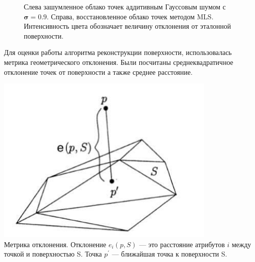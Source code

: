 \begin{figure}
  \centering
  \caption{Слева зашумленное облако точек аддитивным Гауссовым шумом с $\boldsymbol{\sigma = 0.9}$. Справа, восстановленное облако точек методом MLS. Интенсивность цвета обозначает величину отклонения от эталонной поверхности.}
\end{figure}

Для оценки работы алгоритма реконструкции поверхности, использовалась метрика геометрического отклонения. Были посчитаны среднеквадратичное отклонение точек от поверхности а также среднее расстояние.

\begin{center}
    \includegraphics[width=0.8\textwidth]{images/distance.jpg}\\
    Метрика отклонения. Отклонение $e_i(p, S)$ — это расстояние атрибутов $i$ между точкой и поверхностью S. Точка $p^{'}$ — ближайшая точка к поверхности S.
\end{center}

